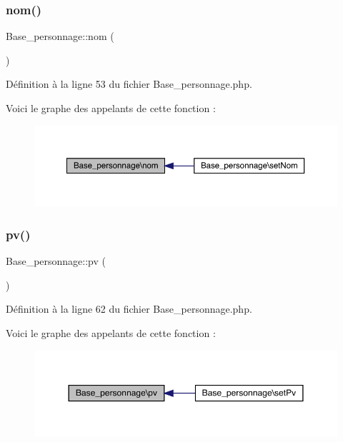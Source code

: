 \subsubsection{\texorpdfstring{nom()}{nom()}}
{\footnotesize\ttfamily Base\+\_\+personnage\+::nom (\begin{DoxyParamCaption}{ }\end{DoxyParamCaption})}



Définition à la ligne 53 du fichier Base\+\_\+personnage.\+php.

Voici le graphe des appelants de cette fonction \+:\nopagebreak
\begin{figure}[H]
\begin{center}
\leavevmode
\includegraphics[width=350pt]{class_base__personnage_abd3b2c38016dc7f95b967225d4dfbd17_icgraph}
\end{center}
\end{figure}
\mbox{\label{class_base__personnage_a2b94389a8a3b5538c0b01e36f3ca55bf}} 
\subsubsection{\texorpdfstring{pv()}{pv()}}
{\footnotesize\ttfamily Base\+\_\+personnage\+::pv (\begin{DoxyParamCaption}{ }\end{DoxyParamCaption})}



Définition à la ligne 62 du fichier Base\+\_\+personnage.\+php.

Voici le graphe des appelants de cette fonction \+:\nopagebreak
\begin{figure}[H]
\begin{center}
\leavevmode
\includegraphics[width=350pt]{class_base__personnage_a2b94389a8a3b5538c0b01e36f3ca55bf_icgraph}
\end{center}
\end{figure}
\mbox{\label{class_base__personnage_a77daa43282aa9b4653c70b4a97dc7948}} 
